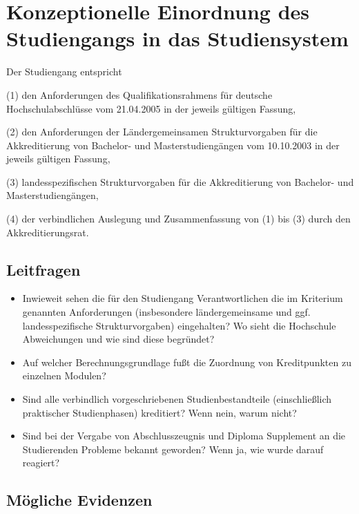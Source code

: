 %

\chapter{Konzeptionelle Einordnung des Studiengangs in das Studiensystem}\label{Konzeptionelle Einordnung des Studiengangs in das Studiensystem}


Der Studiengang entspricht

(1) den Anforderungen des Qualifikationsrahmens für deutsche
Hochschulabschlüsse vom 21.04.2005 in der jeweils gültigen Fassung,

(2) den Anforderungen der Ländergemeinsamen Strukturvorgaben für die
Akkreditierung von Bachelor- und Masterstudiengängen vom 10.10.2003 in
der jeweils gültigen Fassung,

(3) landesspezifischen Strukturvorgaben für die Akkreditierung von
Bachelor- und Masterstudiengängen,

(4) der verbindlichen Auslegung und Zusammenfassung von (1) bis (3)
durch den Akkreditierungsrat.

\section{Leitfragen}\label{leitfragen}

\begin{itemize}
\item
  Inwieweit sehen die für den Studiengang Verantwortlichen die im
  Kriterium genannten Anforderungen (insbesondere ländergemeinsame und
  ggf. landesspezifische Strukturvorgaben) eingehalten? Wo sieht die
  Hochschule Abweichungen und wie sind diese begründet?
\item
  Auf welcher Berechnungsgrundlage fußt die Zuordnung von Kreditpunkten
  zu einzelnen Modulen?
\item
  Sind alle verbindlich vorgeschriebenen Studienbestandteile
  (einschließlich praktischer Studienphasen) kreditiert? Wenn nein,
  warum nicht?
\item
  Sind bei der Vergabe von Abschlusszeugnis und Diploma Supplement an
  die Studierenden Probleme bekannt geworden? Wenn ja, wie wurde darauf
  reagiert?
\end{itemize}

\section{Mögliche Evidenzen}\label{muxf6gliche-evidenzen}

